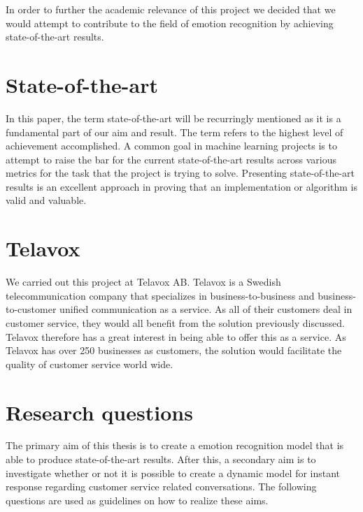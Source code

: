 \documentclass[nofilelist]{cslthse-msc}
\begin{document}
In order to further the academic relevance of this project we decided that we would attempt to contribute to the field of emotion recognition by achieving state-of-the-art results. 

\section{State-of-the-art}
In this paper, the term state-of-the-art will be recurringly mentioned as it is a fundamental part of our aim and result. The term refers to the highest level of achievement accomplished. A common goal in machine learning projects is to attempt to raise the bar for the current state-of-the-art results across various metrics for the task that the project is trying to solve. Presenting state-of-the-art results is an excellent approach in proving that an implementation or algorithm is valid and valuable.   



\section{Telavox}
We carried out this project at Telavox AB. Telavox is a Swedish telecommunication company that specializes in business-to-business and business-to-customer unified communication as a service. As all of their customers deal in customer service, they would all benefit from the solution previously discussed. Telavox therefore has a great interest in being able to offer this as a service. As Telavox has over 250 businesses as customers, the solution would facilitate the quality of customer service world wide.





\section{Research questions}
\label{research_questions}
The primary aim of this thesis is to create a emotion recognition model that is able to produce state-of-the-art results. After this, a secondary aim is to investigate whether or not it is possible to create a dynamic model for instant response regarding customer service related conversations. The following questions are used as guidelines on how to realize these aims.  
\end{document}
